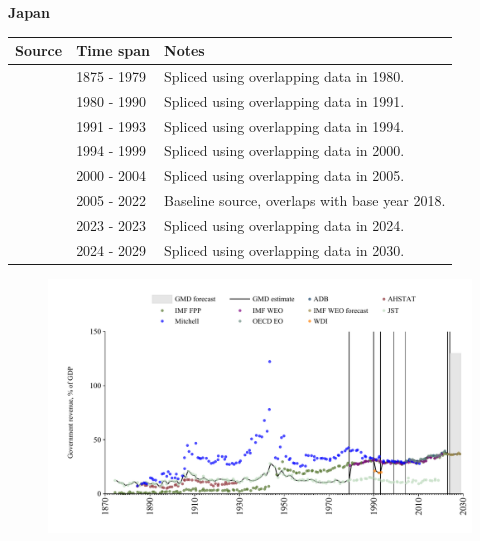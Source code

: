 \documentclass[12pt,a4paper,landscape]{article}
\begin{document}
\begin{adjustbox}{max totalsize={\paperwidth}{\paperheight},center}
\begin{minipage}[t][\textheight][t]{\textwidth}
\vspace*{0.5cm}
{}
\begin{center}
{\Large\bfseries Japan}
\end{center}
\vspace{0.5cm}
\begin{table}[H]
\centering
\small
\begin{tabular}{|l|l|l|}
\hline
\textbf{Source} & \textbf{Time span} & \textbf{Notes} \\
\hline
\rowcolor{white}\cite{JST}& 1875 - 1979 &Spliced using overlapping data in 1980.\\
\rowcolor{lightgray}\cite{IMF_WEO}& 1980 - 1990 &Spliced using overlapping data in 1991.\\
\rowcolor{white}\cite{WDI}& 1991 - 1993 &Spliced using overlapping data in 1994.\\
\rowcolor{lightgray}\cite{IMF_WEO}& 1994 - 1999 &Spliced using overlapping data in 2000.\\
\rowcolor{white}\cite{ADB}& 2000 - 2004 &Spliced using overlapping data in 2005.\\
\rowcolor{lightgray}\cite{OECD_EO}& 2005 - 2022 &Baseline source, overlaps with base year 2018.\\
\rowcolor{white}\cite{IMF_FPP}& 2023 - 2023 &Spliced using overlapping data in 2024.\\
\rowcolor{lightgray}\cite{IMF_WEO_forecast}& 2024 - 2029 &Spliced using overlapping data in 2030.\\
\hline
\end{tabular}
\end{table}
\begin{figure}[H]
\centering
\includegraphics[width=\textwidth,height=0.6\textheight,keepaspectratio]{graphs/JPN_govrev_GDP.pdf}
\end{figure}
\end{minipage}
\end{adjustbox}
\end{document}

